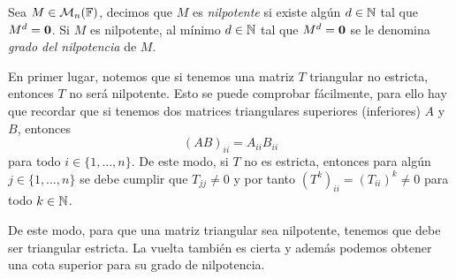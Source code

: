 \begin{defi}
  Sea $M \in \mathcal{M}_n(\mathbb{F})$, decimos que $M$ es \emph{nilpotente} si existe algún $d\in\mathbb{N}$ tal que $M^d = \mathbf{0}$. Si $M$ es nilpotente, al mínimo $d \in \mathbb{N}$ tal que $M^d = \mathbf{0}$ se le denomina \emph{grado del nilpotencia} de $M$.
\end{defi}

En primer lugar, notemos que si tenemos una matriz $T$ triangular no estricta, entonces $T$ no será nilpotente. Esto se puede comprobar fácilmente, para ello hay que recordar que si tenemos dos matrices triangulares superiores (inferiores) $A$ y $B$, entonces
  \[
    (AB)_{ii} = A_{ii} B_{ii}
  \]
para todo $i \in \{1,\ldots,n\}$. De este modo, si $T$ no es estricta, entonces para algún $j \in \{1,\ldots,n\}$ se debe cumplir que $T_{jj} \neq 0$ y por tanto $(T^k)_{ii} = (T_{ii})^k \neq 0$ para todo $k \in \mathbb{N}$.

De este modo, para que una matriz triangular sea nilpotente, tenemos que debe ser triangular estricta. La vuelta también es cierta y además podemos obtener una cota superior para su grado de nilpotencia.

